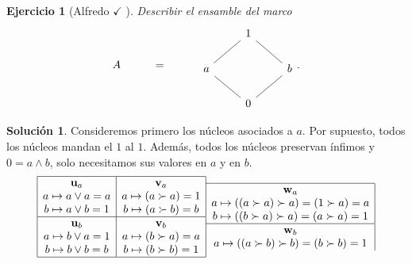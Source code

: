 \documentclass[12pt,letterpaper,titlepage]{article}
\newtheorem{exe}{Ejercicio}
\theoremstyle{definition}
\newtheorem*{sol}{Solución}
\renewcommand\sup{\vee}
\renewcommand\inf{\wedge}
\newcommand\unuc[1]{\mathbf u_{#1}}
\newcommand\vnuc[1]{\mathbf v_{#1}}
\newcommand\wnuc[1]{\mathbf w_{#1}}
\newcommand\<{\langle}
\renewcommand\>{\rangle}
\begin{document}
\begin{exe}[Alfredo $\checkmark$ ]
  Describir el ensamble del marco
  \[
    A\hspace{10mm} = \hspace{10mm}
    \begin{tikzcd}
      & 1 \\
      a \ar[ur,no head] && b\ar[ul,no head] \\
      & 0 \ar[ur,no head] \ar[ul,no head]
    \end{tikzcd}
  .\]
\end{exe}
\begin{sol}
    Consideremos primero los núcleos asociados a $a$.
    Por supuesto, todos los núcleos mandan el $1$ al $1$.
    Además, todos los núcleos preservan ínfimos y $0=a\inf b$,
    solo necesitamos sus valores en $a$ y en $b$.
   \[ 
        \begin{array}{|c|}
            \hline
            \unuc a \\
            a\mapsto a\sup a = a \\
            b\mapsto a\sup b = 1 \\ \hline
            \unuc b \\
            a\mapsto b\sup a = 1 \\
            b\mapsto b\sup b = b \\
            \hline
        \end{array}
        \begin{array}{c|}
            \hline
            \vnuc a \\
            a\mapsto (a\succ a) = 1 \\
            b\mapsto (a\succ b) = b \\ \hline
            \vnuc b \\
            a\mapsto (b\succ a) = a \\
            b\mapsto (b\succ b) = 1 \\
            \hline
        \end{array}
        \begin{array}{c|}
            \hline
            \wnuc a \\
            a\mapsto ((a\succ a)\succ a) = (1\succ a) = a \\
            b\mapsto ((b\succ a)\succ a) = (a\succ a) = 1 \\
            \hline
            \wnuc b \\
            a\mapsto ((a\succ b)\succ b) = (b\succ b) = 1 \\

\end{array}\]
\end{sol}
\end{document}
